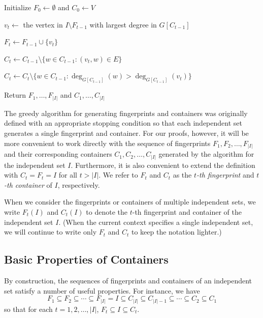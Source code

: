 \documentclass[11pt]{article}
\begin{document}
\begin{algorithm}[ht]
\caption{}
\label{alg:FingerprintContainer}
\smallskip
{}
\medskip
Initialize $F_0 \gets \emptyset$ and $C_0 \gets V$\;

 {
    $v_{t} \gets$ the vertex in $I \setminus F_{t-1}$ with largest degree in $G[C_{t-1}]$\;

    \smallskip 
    $F_t \gets F_{t-1} \cup \{v_t\}$\;
    
    \smallskip
    $C_t \gets C_{t-1} \setminus \big\{ w \in C_{t-1} : (v_t,w) \in E\big\}$\;

    \smallskip
    $C_t \gets C_t \setminus \big\{ w \in C_{t-1} : \deg_{G[C_{t-1}]}(w) > \deg_{G[C_{t-1}]}(v_t) \big\}$\;
}
Return $F_1,\ldots,F_{|I|}$ and $C_1,\ldots,C_{|I|}$\;
\end{algorithm}

The greedy algorithm for generating fingerprints and containers was originally defined with an appropriate stopping condition so that each independent set generates a single fingerprint and container.
For our proofs, however, it will be more convenient to work directly with the sequence of fingerprints $F_1,F_2,\ldots,F_{|I|}$ and their corresponding containers $C_1,C_2,\ldots,C_{|I|}$ generated by the algorithm for the independent set $I$. Furthermore, it is also convenient to extend the definition with $C_t=F_t=I$ for all $t > |I|.$ We refer to $F_t$ and $C_t$ as the \emph{$t$-th fingerprint} and \emph{$t$-th container} of $I$, respectively.

When we consider the fingerprints or containers of multiple independent sets, we write $F_t(I)$ and $C_t(I)$ to denote the $t$-th fingerprint and container of the independent set $I$. (When the current context specifies a single independent set, we will continue to write only $F_t$ and $C_t$ to keep the notation lighter.)

\subsection{Basic Properties of Containers} 

By construction, the sequences of fingerprints and containers of an independent set satisfy a number of useful properties. For instance, we have
\begin{equation}
\label{eq:container-inclusion}
F_1 \subseteq F_2 \subseteq \cdots \subseteq F_{|I|} = I \subseteq C_{|I|} \subseteq C_{|I|-1} \subseteq \cdots \subseteq C_2 \subseteq C_1
\end{equation}
so that for each $t = 1,2,\ldots,|I|$, $F_t \subseteq I \subseteq C_t$.
\end{document}
